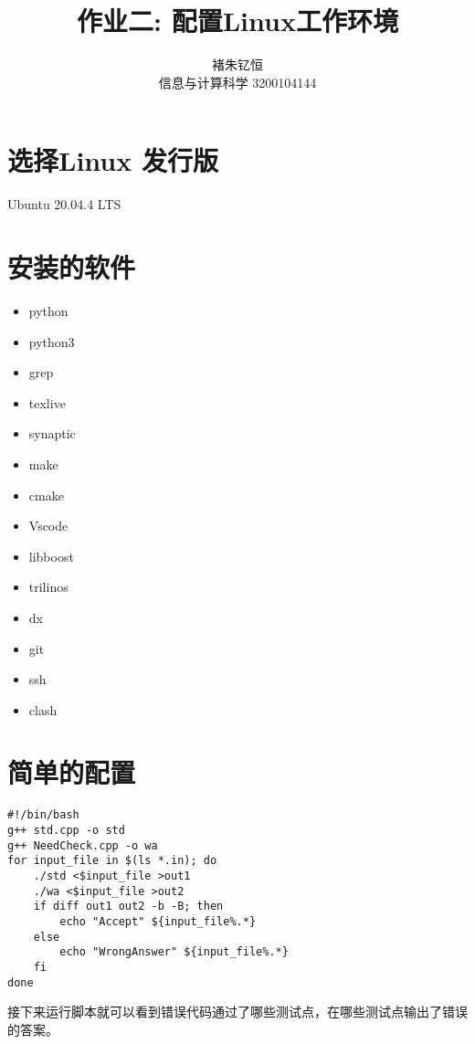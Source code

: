 \documentclass{article}
\title{作业二: 配置Linux工作环境}
\author{褚朱钇恒 \\ 信息与计算科学 3200104144}
\begin{document}
\maketitle

\section{选择Linux 发行版}
    Ubuntu 20.04.4 LTS
\section{安装的软件}
    \begin{itemize}
        \item python
        \item python3
        \item grep
        \item texlive
        \item synaptic
        \item make
        \item cmake
        \item Vscode
        \item libboost
        \item trilinos
        \item dx
        \item git
        \item ssh
        \item clash
    \end{itemize}
\section{简单的配置}


\begin{verbatim}
#!/bin/bash
g++ std.cpp -o std
g++ NeedCheck.cpp -o wa
for input_file in $(ls *.in); do
	./std <$input_file >out1
	./wa <$input_file >out2
	if diff out1 out2 -b -B; then
		echo "Accept" ${input_file%.*}
	else 
		echo "WrongAnswer" ${input_file%.*}
	fi
done
\end{verbatim}

    接下来运行脚本就可以看到错误代码通过了哪些测试点，在哪些测试点输出了错误的答案。
\end{document}
